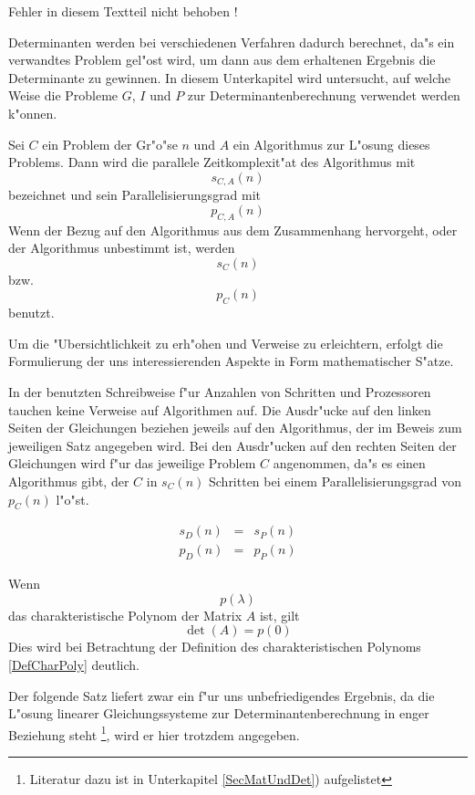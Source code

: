  Fehler in diesem Textteil nicht behoben !


Determinanten werden bei verschiedenen Verfahren dadurch berechnet, da"s
ein verwandtes Problem gel"ost wird, um dann aus dem
erhaltenen Ergebnis die Determinante zu gewinnen. In diesem Unterkapitel
wird untersucht, auf welche Weise die Probleme $G$, $I$ und $P$ zur
Determinantenberechnung verwendet werden k"onnen.

Sei $C$ ein Problem der Gr"o"se $n$
und $A$ ein Algorithmus zur L"osung dieses Problems.
Dann wird die parallele Zeitkomplexit"at des Algorithmus mit
\[ s_{C,A}(n) \] bezeichnet und sein Parallelisierungsgrad mit
\[ p_{C,A}(n) \] Wenn der Bezug auf den Algorithmus aus dem Zusammenhang
hervorgeht, oder der Algorithmus unbestimmt ist, werden
\[ s_C(n) \] bzw. \[ p_C(n) \] benutzt.

Um die "Ubersichtlichkeit zu erh"ohen und Verweise zu erleichtern, erfolgt
die Formulierung der uns interessierenden Aspekte in Form mathematischer
S"atze.

In der benutzten Schreibweise f"ur Anzahlen von Schritten und
Prozessoren tauchen keine Verweise auf Algorithmen auf. Die Ausdr"ucke auf
den linken Seiten der Gleichungen beziehen jeweils auf den Algorithmus, der
im Beweis zum jeweiligen Satz angegeben wird. Bei den Ausdr"ucken auf den
rechten Seiten der Gleichungen wird f"ur das jeweilige Problem $C$
angenommen, da"s es einen Algorithmus gibt, der $C$ in $s_C(n)$ Schritten
bei einem Parallelisierungsgrad von $p_C(n)$ l"o"st.

\begin{korollar}
\label{SatzDdurchP}
 
    \begin{eqnarray*}
        s_D(n) & = & s_P(n)
    \\  p_D(n) & = & p_P(n)
    \end{eqnarray*}
\end{korollar}
\begin{beweis}
    Wenn \[ p(\lambda) \] das charakteristische Polynom der Matrix $A$ ist,
    gilt \[ \det(A) = p(0) \] Dies wird bei Betrachtung der Definition des
    charakteristischen Polynoms \ref{DefCharPoly} deutlich.
\end{beweis}

Der folgende Satz liefert zwar ein f"ur uns unbefriedigendes Ergebnis, da
die L"osung linearer Gleichungssysteme zur Determinantenberechnung in
enger Beziehung steht \footnote{Literatur dazu ist in
Unterkapitel \ref{SecMatUndDet}) aufgelistet}, wird er hier trotzdem
angegeben.

